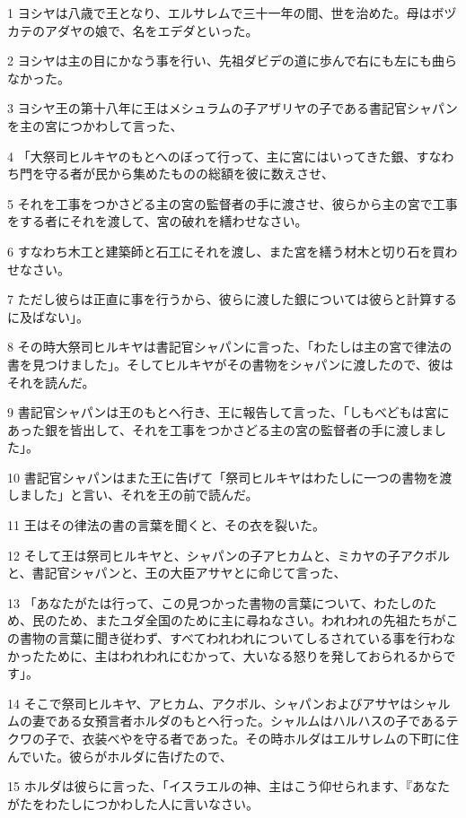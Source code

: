 \par 1 ヨシヤは八歳で王となり、エルサレムで三十一年の間、世を治めた。母はボヅカテのアダヤの娘で、名をエデダといった。
\par 2 ヨシヤは主の目にかなう事を行い、先祖ダビデの道に歩んで右にも左にも曲らなかった。
\par 3 ヨシヤ王の第十八年に王はメシュラムの子アザリヤの子である書記官シャパンを主の宮につかわして言った、
\par 4 「大祭司ヒルキヤのもとへのぼって行って、主に宮にはいってきた銀、すなわち門を守る者が民から集めたものの総額を彼に数えさせ、
\par 5 それを工事をつかさどる主の宮の監督者の手に渡させ、彼らから主の宮で工事をする者にそれを渡して、宮の破れを繕わせなさい。
\par 6 すなわち木工と建築師と石工にそれを渡し、また宮を繕う材木と切り石を買わせなさい。
\par 7 ただし彼らは正直に事を行うから、彼らに渡した銀については彼らと計算するに及ばない」。
\par 8 その時大祭司ヒルキヤは書記官シャパンに言った、「わたしは主の宮で律法の書を見つけました」。そしてヒルキヤがその書物をシャパンに渡したので、彼はそれを読んだ。
\par 9 書記官シャパンは王のもとへ行き、王に報告して言った、「しもべどもは宮にあった銀を皆出して、それを工事をつかさどる主の宮の監督者の手に渡しました」。
\par 10 書記官シャパンはまた王に告げて「祭司ヒルキヤはわたしに一つの書物を渡しました」と言い、それを王の前で読んだ。
\par 11 王はその律法の書の言葉を聞くと、その衣を裂いた。
\par 12 そして王は祭司ヒルキヤと、シャパンの子アヒカムと、ミカヤの子アクボルと、書記官シャパンと、王の大臣アサヤとに命じて言った、
\par 13 「あなたがたは行って、この見つかった書物の言葉について、わたしのため、民のため、またユダ全国のために主に尋ねなさい。われわれの先祖たちがこの書物の言葉に聞き従わず、すべてわれわれについてしるされている事を行わなかったために、主はわれわれにむかって、大いなる怒りを発しておられるからです」。
\par 14 そこで祭司ヒルキヤ、アヒカム、アクボル、シャパンおよびアサヤはシャルムの妻である女預言者ホルダのもとへ行った。シャルムはハルハスの子であるテクワの子で、衣装べやを守る者であった。その時ホルダはエルサレムの下町に住んでいた。彼らがホルダに告げたので、
\par 15 ホルダは彼らに言った、「イスラエルの神、主はこう仰せられます、『あなたがたをわたしにつかわした人に言いなさい。
